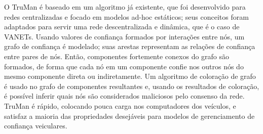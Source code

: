\begin{resumo}
O TruMan é baseado em um algoritmo já existente, que foi desenvolvido para redes centralizadas e focado em modelos ad-hoc estáticos; seus conceitos foram adaptados para servir uma rede descentralizada e dinâmica, que é o caso de VANETs.
Usando valores de confiança formados por interações entre nós, um grafo de confiança é modelado; suas arestas representam as relações de confiança entre pares de nós.
Então, componentes fortemente conexos do grafo são formados, de forma que cada nó em um componente confie nos outros nós do mesmo componente direta ou indiretamente.
Um algoritmo de coloração de grafo é usado no grafo de componentes resultantes e, usando os resultados de coloração, é possível inferir quais nós são considerados maliciosos pelo consenso da rede.
TruMan é rápido, colocando pouca carga nos computadores dos veículos, e satisfaz a maioria das propriedades desejáveis para modelos de gerenciamento de confiança veiculares.

\end{resumo}

